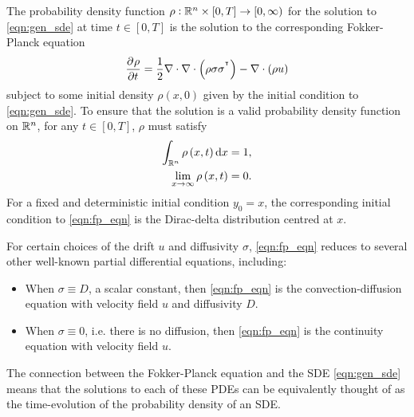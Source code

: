The probability density function \(\rho: \mathbb{R}^n \times [0,T] \to [0,\infty)\) for the solution to \eqref{eqn:gen_sde} at time \(t \in [0,T]\) is the solution to the corresponding Fokker-Planck equation \citep{Risken_2012_FokkerPlanckEquationMethods}
\begin{equation}
	\dpd{\rho}{t} = \frac12\nabla\cdot\nabla\cdot\left(\rho\sigma\sigma^{\T}\right) - \nabla\cdot\left(\rho u\right)
	\label{eqn:fp_eqn}
\end{equation}
subject to some initial density \(\rho\left(x,0\right)\) given by the initial condition to \eqref{eqn:gen_sde}.
To ensure that the solution is a valid probability density function on \(\mathbb{R}^n\), for any \(t \in [0,T]\), \(\rho\) must satisfy
\begin{subequations}\label{eqn:fp_valid_pdf}
	\begin{align}
		\int_{\R^n}{\rho\left(x, t\right)\dif x} = 1, \label{eqn:fp_valid_pdf_norm} \\
		\lim_{x \to \infty}\rho\left(x,t\right) = 0. \label{eqn:fp_valid_pdf_limit}
	\end{align}
\end{subequations}
For a fixed and deterministic initial condition \(y_0 = x\), the corresponding initial condition to \eqref{eqn:fp_eqn} is the Dirac-delta distribution centred at \(x\).

For certain choices of the drift \(u\) and diffusivity \(\sigma\), \eqref{eqn:fp_eqn} reduces to several other well-known partial differential equations, including:
\begin{itemize}
	\item When \(\sigma \equiv D\), a scalar constant, then \eqref{eqn:fp_eqn} is the convection-diffusion equation with velocity field \(u\) and diffusivity \(D\).

	\item When \(\sigma \equiv 0\), i.e. there is no diffusion, then \eqref{eqn:fp_eqn} is the continuity equation with velocity field \(u\).

\end{itemize}
The connection between the Fokker-Planck equation and the SDE \eqref{eqn:gen_sde} means that the solutions to each of these PDEs can be equivalently thought of as the time-evolution of the probability density of an SDE.


